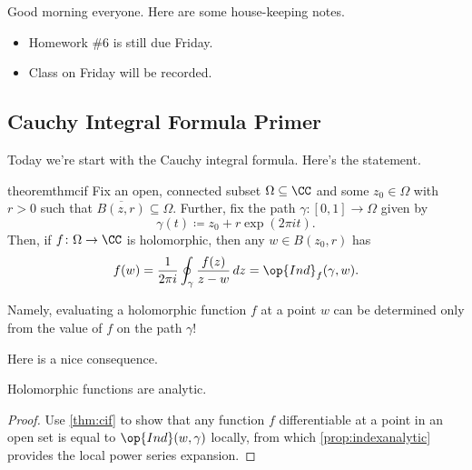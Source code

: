 \documentclass[../notes.tex]{subfiles}
\begin{document}

Good morning everyone. Here are some house-keeping notes.
\begin{itemize}
	\item Homework \#6 is still due Friday.
	\item Class on Friday will be recorded.
\end{itemize}

\subsection{Cauchy Integral Formula Primer}
Today we're start with the Cauchy integral formula. Here's the statement.
\begin{restatable}{theorem}{thmcif} \label{thm:cif}
	Fix an open, connected subset $\Omega\subseteq\CC$ and some $z_0\in\Omega$ with $r>0$ such that $\overline{B(z,r)}\subseteq\Omega$. Further, fix the path $\gamma\colon [0,1]\to\Omega$ given by
	\[\gamma(t)\coloneqq z_0+r\exp(2\pi it).\]
	Then, if $f\colon \Omega\to\CC$ is holomorphic, then any $w\in B(z_0,r)$ has
	\[f(w)=\frac1{2\pi i}\oint_\gamma\frac{f(z)}{z-w}\,dz=\op{Ind}_f(\gamma,w).\]
\end{restatable}
Namely, evaluating a holomorphic function $f$ at a point $w$ can be determined only from the value of $f$ on the path $\gamma$!

Here is a nice consequence.
\begin{corollary} \label{cor:holoisana}
	Holomorphic functions are analytic.
\end{corollary}
\begin{proof}
	Use \autoref{thm:cif} to show that any function $f$ differentiable at a point in an open set is equal to $\op{Ind}(w,\gamma)$ locally, from which \autoref{prop:indexanalytic} provides the local power series expansion.
\end{proof}
\end{document}
